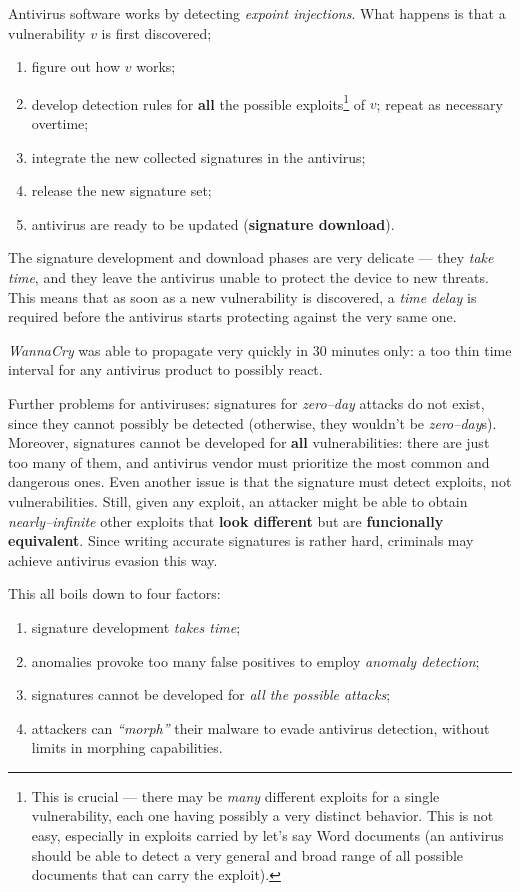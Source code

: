 \documentclass[10pt]{\classname}
\begin{document}
Antivirus software works by detecting \emph{expoint injections}. What happens is that a vulnerability $v$ is first discovered; 
\begin{enumerate}
    \item figure out how $v$ works;
    \item develop detection rules for \textbf{all} the possible
        exploits\footnote{This is crucial --- there may be \emph{many} different
        exploits for a single vulnerability, each one having possibly a very
    distinct behavior. This is not easy, especially in exploits carried by
let's say Word documents (an antivirus should be able to detect a very general
and broad range of all possible documents that can carry the exploit).} of $v$;
repeat as necessary overtime; 
    \item integrate the new collected signatures in the antivirus;
    \item release the new signature set;
    \item antivirus are ready to be updated (\textbf{signature download}).
\end{enumerate}

The signature development and download phases are very delicate --- they
\emph{take time}, and they leave the antivirus unable to protect the device to
new threats. This means that as soon as a new vulnerability is discovered, a
\emph{time delay} is required before the antivirus starts protecting against
the very same one. 

\emph{WannaCry} was able to propagate very quickly in 30 minutes only: a too
thin time interval for any antivirus product to possibly react.

Further problems for antiviruses: signatures for \emph{zero--day} attacks do
not exist, since they cannot possibly be detected (otherwise, they wouldn't be
\emph{zero--day}s). Moreover, signatures cannot be developed for \textbf{all}
vulnerabilities: there are just too many of them, and antivirus vendor must
prioritize the most common and dangerous ones. Even another issue is that the
signature must detect exploits, not vulnerabilities. Still, given any
exploit, an attacker might be able to obtain \emph{nearly--infinite} other
exploits that \textbf{look different} but are \textbf{funcionally equivalent}.
Since writing accurate signatures is rather hard, criminals may achieve
antivirus evasion this way.

This all boils down to four factors:
\begin{enumerate}
    \item signature development \emph{takes time};
    \item anomalies provoke too many false positives to employ \emph{anomaly
        detection};
    \item signatures cannot be developed for \emph{all the possible attacks};
    \item attackers can \emph{``morph''} their malware to evade antivirus
        detection, without limits in morphing capabilities.
\end{enumerate}
\end{document}
